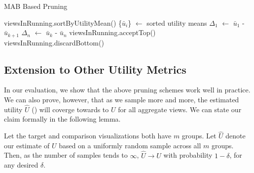 \begin{algorithm}
\caption{MAB Based Pruning}
\label{algo:mab_based_pruning}
\begin{algorithmic}[1]
\State viewsInRunning.sortByUtilityMean()
\State \{$\bar{u}_{i}$\} $\gets$ sorted utility means
\State $\Delta_1$ $\gets$ $\bar{u}_{1}$ - $\bar{u}_{k+1}$
\State $\Delta_n$ $\gets$ $\bar{u}_{k}$ - $\bar{u}_{n}$
\State viewsInRunning.acceptTop()
\Else
\State viewsInRunning.discardBottom()
\EndIf
\end{algorithmic}
\end{algorithm}



\subsection{Extension to Other Utility Metrics}



In our evaluation, we show that the above  pruning schemes
work  well in practice. 
We can also prove, however,  that as we sample more and more, the estimated utility
$\hat{U}$ () will coverge towards to $U$ for all aggregate views.
We can state our claim formally in the following lemma. 

\begin{lemma}
Let the target and comparison visualizations
both have $m$ groups.
Let $\hat{U}$ denote our estimate of $U$ based on a uniformly random sample 
across all $m$ groups. 
Then, as the number of samples tends to $\infty$, $\hat{U} \rightarrow U$
with probability $1-\delta$, for any desired $\delta$.
\end{lemma}